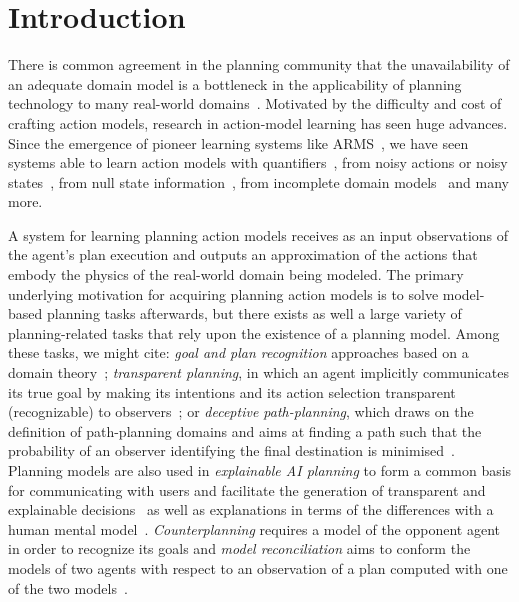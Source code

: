 
\section{Introduction}
\label{sec:introduction}

There is common agreement in the planning community that the unavailability of an \textcolor[rgb]{1.00,0.00,0.00}{adequate} domain model is a bottleneck in the applicability of planning technology to many real-world domains~\cite{kambhampati:modellite:AAAI2007}. Motivated by the difficulty and cost of crafting action models, research in action-model learning has seen huge advances. Since the emergence of pioneer learning systems like ARMS~\cite{yang2007learning}, we have seen systems able to learn action models with quantifiers~\cite{AmirC08,ZhuoYHL10}, from noisy actions or noisy states~\cite{zhuo2013action,MouraoZPS12}, from null state information~\cite{cresswell2013acquiring}, from incomplete domain models~\cite{ZhuoNK13,ZhuoK17} and many more.

A system for learning planning action models receives as an input observations of the agent's plan execution and \textcolor[rgb]{1.00,0.00,0.00}{outputs an approximation of the actions that embody the physics of the real-world domain being modeled.} The primary underlying motivation for acquiring planning action models is to solve model-based planning tasks afterwards, \textcolor[rgb]{1.00,0.00,0.00}{but there exists as well a large variety of planning-related tasks that rely upon the existence of a planning model. Among these tasks, we might cite: \emph{goal and plan recognition} approaches based on a domain theory~\cite{ramirez2009plan,ramirez2012plan,SohrabiRU16}; \emph{transparent planning}, in which an agent implicitly communicates its true goal by making its intentions and its action selection transparent (recognizable) to observers~\cite{MacNallyLRP18}; or \emph{deceptive path-planning}, which draws on the definition of path-planning domains and aims at finding a path such that the probability of an observer identifying the final destination is minimised~\cite{MastersS17}. Planning models are also used in \emph{explainable AI planning} to form a common basis for communicating with users and facilitate the generation of transparent and explainable decisions~\cite{FoxLM17} as well as explanations in terms of the differences with a human mental model~\cite{ChakrabortiSK18}. \emph{Counterplanning} requires a model of the opponent agent in order to recognize its goals \cite{PozancoEFB18} and \emph{model reconciliation} aims to conform the models of two agents with respect to an observation of a plan computed with one of the two models~\cite{ChakrabortiSZK17}.}

